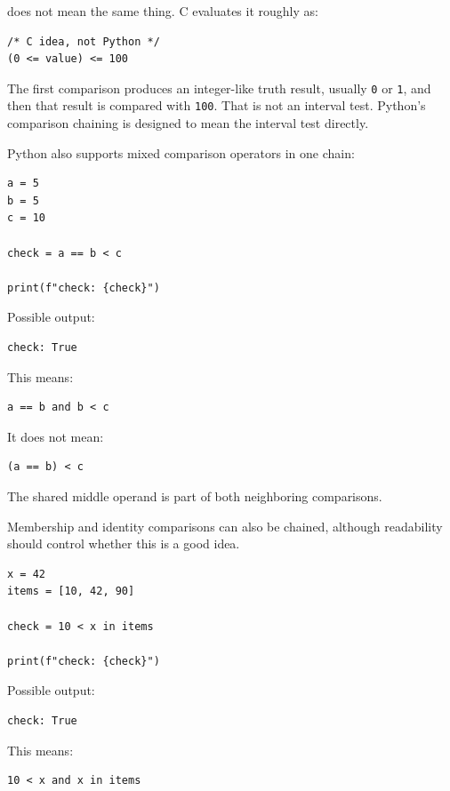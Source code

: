 does not mean the same thing. C evaluates it roughly as:

\begin{verbatim}
/* C idea, not Python */
(0 <= value) <= 100
\end{verbatim}

The first comparison produces an integer-like truth result, usually \texttt{0} or \texttt{1}, and then that result is compared with \texttt{100}. That is not an interval test. Python's comparison chaining is designed to mean the interval test directly.

Python also supports mixed comparison operators in one chain:

\begin{verbatim}
a = 5
b = 5
c = 10

check = a == b < c

print(f"check: {check}")
\end{verbatim}

Possible output:

\begin{verbatim}
check: True
\end{verbatim}

This means:

\begin{verbatim}
a == b and b < c
\end{verbatim}

It does not mean:

\begin{verbatim}
(a == b) < c
\end{verbatim}

The shared middle operand is part of both neighboring comparisons.

Membership and identity comparisons can also be chained, although readability should control whether this is a good idea.

\begin{verbatim}
x = 42
items = [10, 42, 90]

check = 10 < x in items

print(f"check: {check}")
\end{verbatim}

Possible output:

\begin{verbatim}
check: True
\end{verbatim}

This means:

\begin{verbatim}
10 < x and x in items
\end{verbatim}

